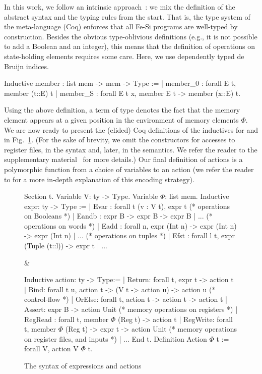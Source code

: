 \documentclass{llncs}
\begin{document}
In this work, we follow an intrinsic
approach~\cite{DBLP:journals/jar/BentonHKM12}: we mix the definition
of the abstract syntax and the typing rules from the start. That is,
the type system of the meta-language (Coq) enforces that all Fe-Si
programs are well-typed by construction.
%
Besides the obvious type-oblivious definitions (e.g., it is not
possible to add a Boolean and an integer), this means that the
definition of operations on state-holding elements requires some care.
%
Here, we use dependently typed de Bruijn indices. 
\begin{mcoq}
Inductive member : list mem -> mem ->  Type :=
| member_0 : forall E t, member (t::E) t
| member_S : forall E t x, member E t -> member (x::E) t.
\end{mcoq}
Using the above definition, a term of type  denotes
the fact that the memory element  appears at a given position
in the environment of memory elements $\Phi$. 
%
We are now ready to present the (elided) Coq definitions of the
inductives for  and  in Fig.~\ref{fig:fesi}.
%
(For the sake of brevity, we omit the constructors for accesses to
register files, in the syntax and, later, in the semantics. We refer
the reader to the supplementary material~\cite{fesi} for more details.)
%
Our final definition  of actions is a polymorphic
function from a choice of variables to an action (we refer the reader
to \cite{phoas-chlipala} for a more in-depth explanation of this
encoding strategy).

\begin{figure}
  \centering
  \begin{twolistings}
\begin{coq}
Section t. 
Variable V: ty -> Type. Variable $\Phi$: list mem. 
Inductive expr: ty -> Type :=
| Evar : forall t (v : V t), expr t
(* operations on Booleans *)
| Eandb : expr B -> expr B -> expr B | ... 
(* operations on words *)
| Eadd : forall n, expr (Int n) -> expr (Int n) -> expr (Int n) | ... 
(* operations on tuples *)
| Efst : forall l t, expr (Tuple (t::l)) -> expr t | ...
\end{coq}
&
\begin{coq}
Inductive action: ty -> Type:=
| Return: forall t, expr t -> action t
| Bind: forall t u,  action  t -> (V t -> action u) -> action u
(* control-flow *)
| OrElse: forall t, action t -> action t -> action t
| Assert: expr B -> action Unit    
(* memory operations on registers *)
| RegRead : forall t, member $\Phi$ (Reg t) -> action t
| RegWrite: forall t, member $\Phi$ (Reg t) -> expr t -> action Unit
(* memory operations on register files, and inputs *)
| ... 
End t. 
Definition Action $\Phi$ t := forall V, action V $\Phi$ t.  
\end{coq}
\end{twolistings}
  \caption{The syntax of expressions and actions}
  \label{fig:fesi}
\end{figure}
\end{document}

